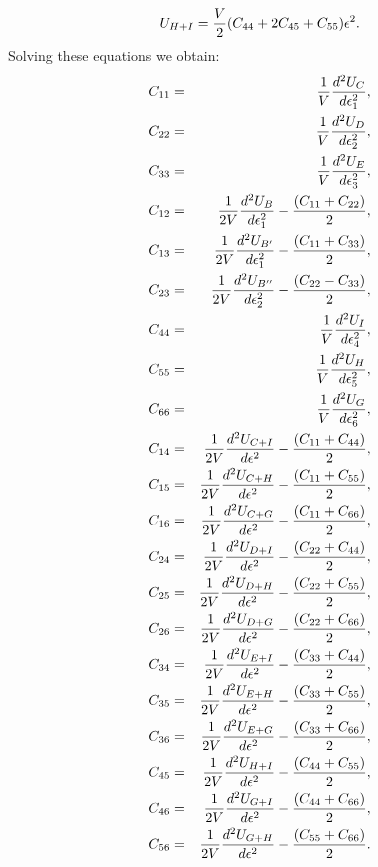 \documentclass[12pt,a4paper,twoside]{report}
\begin{document}
\begin{equation}
U_{H+I}= {V \over 2} (C_{44}+2 C_{45} + C_{55}) \epsilon^2.
\end{equation}
Solving these equations we obtain:
\begin{eqnarray}
C_{11}&=&{1 \over V} {d^2 U_C \over d \epsilon_1^2}, \\ 
C_{22}&=&{1 \over V} {d^2 U_D \over d \epsilon_2^2}, \\ 
C_{33}&=&{1 \over V} {d^2 U_E \over d \epsilon_3^2}, \\ 
C_{12}&=&{1 \over 2 V} {d^2 U_B \over d \epsilon_1^2} - 
                             {(C_{11}+ C_{22})\over 2}, \\
C_{13}&=&{1 \over 2 V} {d^2 U_{B'} \over d \epsilon_1^2} - 
                             {(C_{11} + C_{33})\over 2}, \\
C_{23}&=&{1 \over 2 V} {d^2 U_{B''} \over d \epsilon_2^2} - 
                             {(C_{22} - C_{33})\over 2}, \\
C_{44}&=&{1 \over V} {d^2 U_I \over d \epsilon_4^2}, \\
C_{55}&=&{1 \over V} {d^2 U_H \over d \epsilon_5^2}, \\
C_{66}&=&{1 \over V} {d^2 U_G \over d \epsilon_6^2}, \\
C_{14}&=&{1 \over 2 V} {d^2 U_{C+I} \over d \epsilon^2} - {(C_{11} + C_{44})\over 2}, \\
C_{15}&=&{1 \over 2 V} {d^2 U_{C+H} \over d \epsilon^2} - {(C_{11} + C_{55})\over 2}, \\
C_{16}&=&{1 \over 2 V} {d^2 U_{C+G} \over d \epsilon^2} - {(C_{11} + C_{66})\over 2}, \\
C_{24}&=&{1 \over 2 V} {d^2 U_{D+I} \over d \epsilon^2} - {(C_{22} + C_{44})\over 2}, \\
C_{25}&=&{1 \over 2 V} {d^2 U_{D+H} \over d \epsilon^2} - {(C_{22} + C_{55})\over 2}, \\
C_{26}&=&{1 \over 2 V} {d^2 U_{D+G} \over d \epsilon^2} - {(C_{22} + C_{66})\over 2}, \\
C_{34}&=&{1 \over 2 V} {d^2 U_{E+I} \over d \epsilon^2} - {(C_{33} + C_{44})\over 2}, \\
C_{35}&=&{1 \over 2 V} {d^2 U_{E+H} \over d \epsilon^2} - {(C_{33} + C_{55})\over 2}, \\
C_{36}&=&{1 \over 2 V} {d^2 U_{E+G} \over d \epsilon^2} - {(C_{33} + C_{66})\over 2}, \\
C_{45}&=&{1 \over 2 V} {d^2 U_{H+I} \over d \epsilon^2} - {(C_{44} + C_{55})\over 2}, \\
C_{46}&=&{1 \over 2 V} {d^2 U_{G+I} \over d \epsilon^2} - {(C_{44} + C_{66})\over 2}, \\
C_{56}&=&{1 \over 2 V} {d^2 U_{G+H} \over d \epsilon^2} - {(C_{55} + C_{66})\over 2}.
\end{eqnarray}
\end{document}
